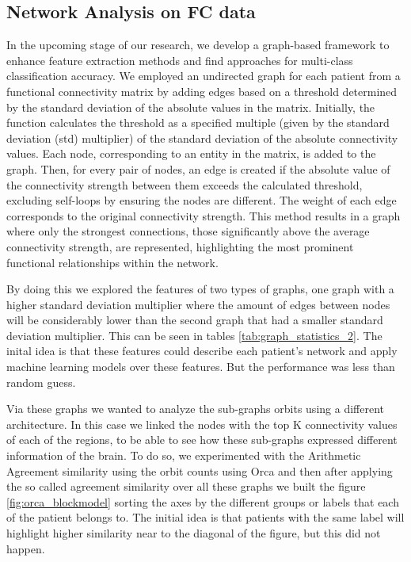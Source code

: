 \documentclass[fleqn,moreauthors,10pt]{ds_report}
\begin{document}
\subsection*{Network Analysis on FC data}
In the upcoming stage of our research, we develop a graph-based framework to enhance feature extraction methods and find approaches for multi-class classification accuracy. We employed an undirected graph for each patient from a functional connectivity matrix by adding edges based on a threshold determined by the standard deviation of the absolute values in the matrix. Initially, the function calculates the threshold as a specified multiple (given by the standard deviation (std) multiplier) of the standard deviation of the absolute connectivity values. Each node, corresponding to an entity in the matrix, is added to the graph. Then, for every pair of nodes, an edge is created if the absolute value of the connectivity strength between them exceeds the calculated threshold, excluding self-loops by ensuring the nodes are different. The weight of each edge corresponds to the original connectivity strength. This method results in a graph where only the strongest connections, those significantly above the average connectivity strength, are represented, highlighting the most prominent functional relationships within the network. 

By doing this we explored the features of two types of graphs, one graph with a higher standard deviation multiplier where the amount of edges between nodes will be considerably lower than the second graph that had a smaller standard deviation multiplier. This can be seen in tables \ref{tab:graph_statistics_2}. The inital idea is that these features could describe each patient's network and apply machine learning models over these features. But the performance was less than random guess.

Via these graphs we wanted to analyze the sub-graphs orbits using a different architecture. In this case we linked the nodes with the top K connectivity values of each of the regions, to be able to see how these sub-graphs expressed different information of the brain. To do so, we experimented with the Arithmetic Agreement similarity using the orbit counts using Orca \cite{orca} and then after applying the so called agreement similarity over all these graphs we built the figure \ref{fig:orca_blockmodel}  sorting the axes by the different groups or labels that each of the patient belongs to. The initial idea is that patients with the same label will highlight higher similarity near to the diagonal of the figure, but this did not happen.  
\end{document}
